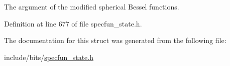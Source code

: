 The argument of the modified spherical Bessel functions. 



Definition at line 677 of file specfun\+\_\+state.\+h.



The documentation for this struct was generated from the following file\+:\begin{DoxyCompactItemize}
\item 
include/bits/\hyperlink{specfun__state_8h}{specfun\+\_\+state.\+h}\end{DoxyCompactItemize}
